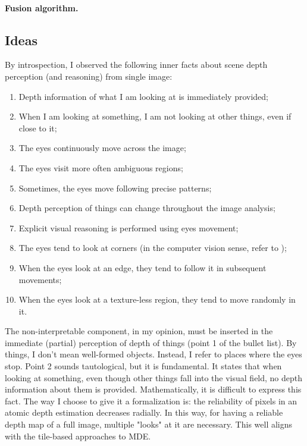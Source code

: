 \paragraph{Fusion algorithm.}


\subsection{Ideas}
By introspection, I observed the following inner facts about scene depth perception (and reasoning) from single image:
\begin{enumerate}
    \item{
        Depth information of what I am looking at is immediately provided;
    }
    \item{
        When I am looking at something, I am not looking at other things, even if close to it;
    }
    \item{
        The eyes continuously move across the image;
    }
    \item{
        The eyes visit more often ambiguous regions;
    }
    \item{
        Sometimes, the eyes move following precise patterns;
    }
    \item{
        Depth perception of things can change throughout the image analysis;
    }
    \item{
        Explicit visual reasoning is performed using eyes movement;
    }
    \item{
        The eyes tend to look at corners (in the computer vision sense, refer to \cite{computer_vision});
    }
    \item{
        When the eyes look at an edge, they tend to follow it in subsequent movements;
    }
    \item{
        When the eyes look at a texture-less region, they tend to move randomly in it.
    }
\end{enumerate}
The non-interpretable component, in my opinion, must be inserted in the immediate (partial) perception of depth of things (point 1 of the bullet list).
By things, I don't mean well-formed objects.
Instead, I refer to places where the eyes stop.
Point 2 sounds tautological, but it is fundamental.
It states that when looking at something, even though other things fall into the visual field, no depth information about them is provided.
Mathematically, it is difficult to express this fact.
The way I choose to give it a formalization is: the reliability of pixels in an atomic depth estimation decreases radially.
In this way, for having a reliable depth map of a full image, multiple "looks" at it are necessary.
This well aligns with the tile-based approaches to MDE.